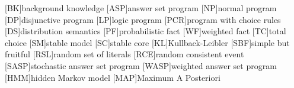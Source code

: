 \newcommand{\pwC}{\ensuremath{\mu_{\textrm{\cla{C}}}}}   
\newcommand{\pwc}[1]{\ensuremath{\pwC\at{#1}}}     
\newcommand{\pwE}{\ensuremath{\mu_{\EVENTSset}}}   
\newcommand{\pwe}[1]{\ensuremath{\pwE\at{#1}}}     
%
%
%
\newcommand{\stablecore}[1]{\ensuremath{\left\llbracket #1 \right\rrbracket}}
\newcommand{\inconsistent}{\bot}
\newcommand{\given}{\ensuremath{~\middle|~}}
\newcommand{\consequenceclass}{\ensuremath{\Lambda}}
\newcommand{\indepclass}{\ensuremath{\Diamond}}
\newcommand{\probfact}[2]{\ensuremath{#1:#2}}
\newcommand{\probrule}[3]{\probfact{#1}{#2} \leftarrow #3}
\newcommand{\weightfact}[2]{\ensuremath{#1\!:\!#2}}
\newcommand{\weightrule}[3]{\weightfact{#1}{#2} \leftarrow #3}
\newcommand{\class}[1]{\ensuremath{[{#1}]_{\sim}}}
\newcommand{\tcgen}[1]{\MODELset\at{#1}}
\newcommand{\condsymb}[2]{\ensuremath{p_{#1|#2}}}
\newcommand{\lpmln}{\texttt{LP\textsuperscript{MLN}}}
\newcommand{\emptyevent}{\ensuremath{\lambda}}
\newcommand{\powerset}[1]{\ensuremath{\mathbb{P}\at{#1}}}
%
%
[BK]{background knowledge}
[ASP]{answer set program}
[NP]{normal program}
[DP]{disjunctive program}
[LP]{logic program}
[PCR]{program with choice rules}
[DS]{distribution semantics}
[PF]{probabilistic fact}
[WF]{weighted fact}
[TC]{total choice}
[SM]{stable model}
[SC]{stable core}
[KL]{Kullback-Leibler}
[SBF]{simple but fruitful}
[RSL]{random set of literals}
[RCE]{random consistent event}
[SASP]{stochastic answer set program}
[WASP]{weighted answer set program}
[HMM]{hidden Markov model}
[MAP]{Maximum A Posteriori}
%
%
\newcommand{\sbf}{\ensuremath{\mathrm{sbf}}}
%
%
\newcommand{\LOOK}{\ensuremath{\blacksquare}}
\newcommand{\delete}[1]{\sout{#1}}
\newcommand{\sidenote}[1]{\stepcounter{revcounter}{\color{red!50!black}\(\vert^{\arabic{revcounter}}\)}\marginpar{{\color{red!50!black}\(^{\arabic{revcounter}}\vert\)}\scriptsize #1}}
\newcommand{\replace}[2]{\delete{#1}\sidenote{#2}}
\newcommand{\franc}[1]{{\color{green!30!black}#1}}
\newcommand{\bruno}{\color{red!60!black}}
\newcommand{\dietmar}[1]{{\color{brown!40!black}#1}}


\newcommand{\selfnote}[1]{\todo[backgroundcolor=green!20]{{\footnotesize #1}}}
\newcommand{\spanote}[1]{{\todo[size=footnotesize,color=teal!20]{\textbf{SPA:} #1}}}
\newcommand{\dsnote}[1]{{\todo[size=footnotesize,color=teal!20]{\textbf{DS:} #1}}}
\newcommand{\francnote}[1]{{\todo[size=footnotesize,color=green!30]{\textbf{FC:} #1}}}
\newcommand{\bdnote}[1]{{\todo[size=footnotesize,color=red!60]{\textbf{BD:} #1}}}
